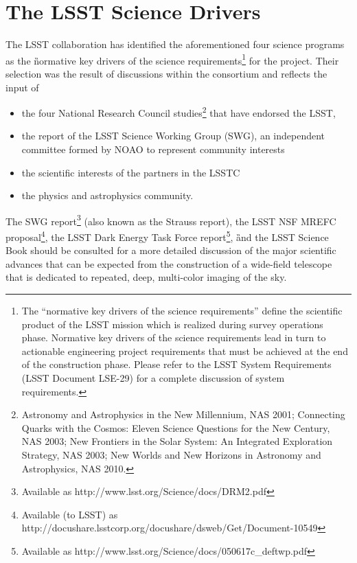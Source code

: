 \section{The LSST Science Drivers }
\label{scidriv}

The LSST collaboration has identified the aforementioned four science
programs as the \G{normative} key drivers of the science
requirements\footnote{The ``normative key drivers of the science requirements'' define
the scientific product of the LSST mission which is realized during survey operations phase.
Normative key drivers of the science requirements lead in turn to actionable engineering project
requirements that must be achieved at the end of the construction phase.  Please refer to the
LSST System Requirements (LSST Document LSE-29) for a complete discussion of system requirements.}
for the project. Their selection was the result of discussions within the
consortium and reflects the input of
\begin{itemize}
\item the four National Research Council studies\footnote{
  Astronomy and Astrophysics in the New Millennium, NAS 2001;
  Connecting Quarks with the Cosmos: Eleven Science Questions for the New Century, NAS 2003;
  New Frontiers in the Solar System: An Integrated Exploration Strategy, NAS 2003;
  New Worlds and New Horizons in Astronomy and Astrophysics, NAS 2010.
} that have endorsed the LSST,
\item the report of the LSST Science Working Group (SWG), an independent
      committee formed by NOAO to represent community interests
\item the scientific interests of the partners in the LSSTC
\item the physics and astrophysics community.
\end{itemize}

The SWG report\footnote{Available as
http://www.lsst.org/Science/docs/DRM2.pdf} (also known as the Strauss
report), the LSST NSF MREFC proposal\footnote{Available (to LSST) as
http://docushare.lsstcorp.org/docushare/dsweb/Get/Document-10549},
the LSST Dark Energy Task Force report\footnote{Available as
http://www.lsst.org/Science/docs/050617c\_deftwp.pdf}, \G{and the LSST
Science Book} should be
consulted for a more detailed discussion of the major scientific advances
that can be expected from the construction of a wide-field telescope that
is dedicated to repeated, deep, multi-color imaging of the sky.

